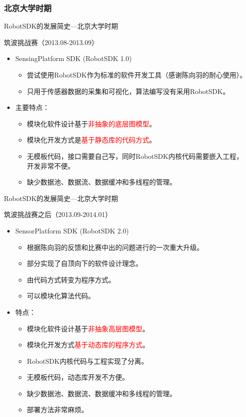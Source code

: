 \documentclass[9pt]{beamer}
\begin{document}
	\subsubsection{北京大学时期}
	\begin{frame}{RobotSDK的发展简史---北京大学时期}
		\begin{block}{筑波挑战赛（2013.08-2013.09）}
			\begin{itemize}
				\item SensingPlatform SDK (RobotSDK 1.0)
				\begin{itemize}
					\item 尝试使用RobotSDK作为标准的软件开发工具（感谢陈向羽的耐心使用）。
					\item 只用于传感器数据的采集和可视化，算法编写没有采用RobotSDK。
				\end{itemize}
				\item 主要特点：
				\begin{itemize}
					\item 模块化软件设计基于\textcolor{red}{非抽象的底层图模型}。
					\item 模块化开发方式是\textcolor{red}{基于静态库的代码方式}。
					\item 无模板代码，接口需要自己写，同时RobotSDK内核代码需要嵌入工程，开发非常不便。
					\item 缺少数据池、数据流、数据缓冲和多线程的管理。					
				\end{itemize}
			\end{itemize}
		\end{block}
	\end{frame}
	\begin{frame}{RobotSDK的发展简史---北京大学时期}
		\begin{block}{筑波挑战赛之后（2013.09-2014.01）}
			\begin{itemize}
				\item SensorPlatform SDK (RobotSDK 2.0)
				\begin{itemize}
					\item 根据陈向羽的反馈和比赛中出的问题进行的一次重大升级。
					\item 部分实现了自顶向下的软件设计理念。
					\item 由代码方式转变为程序方式。
					\item 可以模块化算法代码。
				\end{itemize}
				\item 特点：
				\begin{itemize}
					\item 模块化软件设计基于\textcolor{red}{非抽象高层图模型}。
					\item 模块化开发方式\textcolor{red}{基于动态库的程序方式}。
					\item RobotSDK内核代码与工程实现了分离。
					\item 无模板代码，动态库开发不方便。
					\item 缺少数据池、数据流、数据缓冲和多线程的管理。	
					\item 部署方法非常麻烦。
				\end{itemize}
			\end{itemize}
		\end{block}
	\end{frame}
\end{document}
